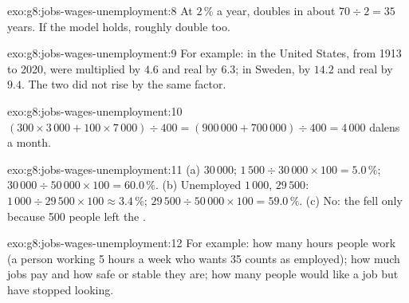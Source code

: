 \begin{solution}{exo:g8:jobs-wages-unemployment:8}
At $2\,\%$ a year,  doubles in about $70 \div 2 = 35$ years. If the model holds,  roughly double too.
\end{solution}

\begin{solution}{exo:g8:jobs-wages-unemployment:9}
For example: in the United States, from 1913 to 2020,  were multiplied by $4.6$ and real  by $6.3$; in Sweden,  by $14.2$ and real  by $9.4$. The two did not
rise by the same factor.
\end{solution}

\begin{solution}{exo:g8:jobs-wages-unemployment:10}
$(300 \times 3\,000 + 100 \times 7\,000) \div 400 = (900\,000 + 700\,000) \div 400 = 4\,000$ dalens a
month.
\end{solution}

\begin{solution}{exo:g8:jobs-wages-unemployment:11}
(a)  $30\,000$;  $1\,500 \div 30\,000 \times 100 = 5.0\,\%$;
 $30\,000 \div 50\,000 \times 100 = 60.0\,\%$. (b) Unemployed $1\,000$, 
$29\,500$:  $1\,000 \div 29\,500 \times 100 \approx 3.4\,\%$; 
$29\,500 \div 50\,000 \times 100 = 59.0\,\%$. (c) No: the  fell only because 500
people left the .
\end{solution}

\begin{solution}{exo:g8:jobs-wages-unemployment:12}
For example: how many hours people work (a person working 5 hours a week who wants 35 counts as
employed); how much jobs pay and how safe or stable they are; how many people would like a job but
have stopped looking.
\end{solution}

